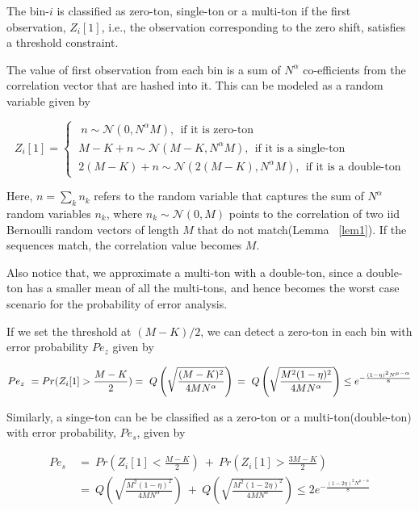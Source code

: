  
 The bin-$i$ is classified as zero-ton, single-ton or a multi-ton if the first observation, $Z_{i}[1]$, i.e., the observation corresponding to the zero shift, satisfies a threshold constraint. 

The value of first observation from each bin is a sum of $N^\alpha$ co-efficients from the correlation vector that are hashed into it. This can be modeled as a random variable given by


	
\[
Z_{i}[1] = \left\{
\begin{array}{ll}
\ \ n \sim \mathcal{N}(0,N^\alpha M) , \ \ \text{if it is zero-ton} \\
\ M-K + n  \sim \mathcal{N}(M - K,N^\alpha M) , \ \ \text{if it is a single-ton}\\
\ 2(M-K) + n  \sim \mathcal{N}(2(M - K),N^\alpha M) , \ \ \text{if it is a double-ton}
\end{array}
\right. 
\]


Here, $n = \sum_k n_k$ refers to the random variable that captures the sum of $N^\alpha$ random variables $n_k$, where $n_k \sim \mathcal{N}(0,M)$ points to the correlation of two iid Bernoulli random vectors of length $M$ that do not match(Lemma ~\ref{lem1}). If the sequences match, the correlation value becomes $M$.  

Also notice that, we approximate a multi-ton with a double-ton, since a double-ton has a smaller mean of all the multi-tons, and hence becomes the worst case scenario for the probability of error analysis.


If we set the threshold at $(M-K)/2$, we can detect a zero-ton in each bin with error probability $Pe_{z}$ given by

\[ 
Pe_{z} \ = Pr(Z_i[1]> \frac{M-K}{2}) =\ Q \left ( \sqrt{\frac{(M-K)^2}{4 M N^{\alpha}}} \right ) \\
           = \ Q \left ( \sqrt{\frac{M^2(1-\eta)^2}{4 M N^{\alpha}}} \right ) \leq e^{- \frac{(1-\eta)^2N^{\mu-\alpha}}{8}}
\]

Similarly, a singe-ton can be be classified as a zero-ton or a multi-ton(double-ton) with error probability, $Pe_{s}$, given by

\[ 
\begin{array}{ll}
 Pe_{s} \  &= \   Pr( Z_i[1] < \frac{M-K}{2}) \  + \ Pr( Z_i[1] > \frac{3M-K}{2}) \\
          &= \   Q \left ( \sqrt{\frac{M^2(1-\eta)^2}{4 M N^{\alpha}}}\right) \ + \ Q \left ( \sqrt{\frac{M^2(1-2\eta)^2}{4 M N^{\alpha}}} \right ) \leq 2 e^{- \frac{(1-2\eta)^2N^{\mu-\alpha}}{8}}
\end{array}
\]

